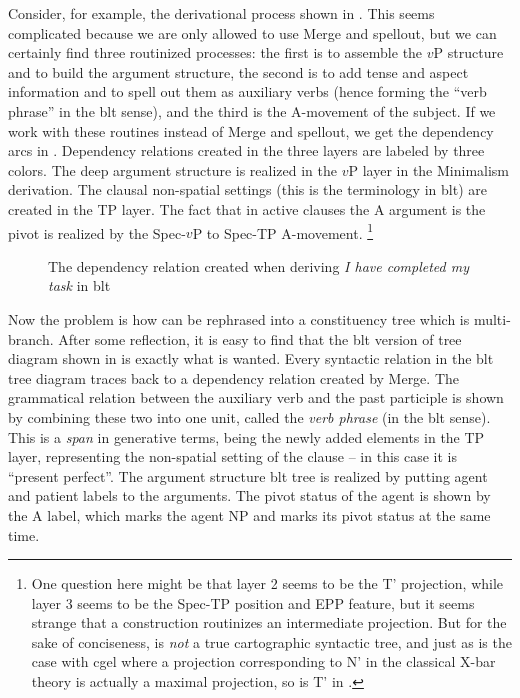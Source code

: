 \documentclass[../main.tex]{subfiles}
\begin{document}
Consider, for example, the derivational process shown in .
This seems complicated because we are only allowed to use Merge and spellout, 
but we can certainly find three routinized processes: 
the first is to assemble the $v$P structure and to build the argument structure, 
the second is to add tense and aspect information and to spell out them as auxiliary verbs
(hence forming the ``verb phrase'' in the \ac{blt} sense), 
and the third is the A-movement of the subject.
If we work with these routines instead of Merge and spellout, 
we get the dependency arcs in .
Dependency relations created in the three layers are labeled by three colors.
The deep argument structure is realized in the $v$P layer in the Minimalism derivation.
The clausal non-spatial settings (this is the terminology in \ac{blt}) are created in the TP layer.
The fact that in active clauses the A argument is the pivot is realized by the Spec-$v$P to Spec-TP A-movement.%
\footnote{One question here might be that layer 2 seems to be the T' projection, 
while layer 3 seems to be the Spec-TP position and EPP feature, 
but it seems strange that a construction routinizes an intermediate projection. 
But for the sake of conciseness, 
 is \emph{not} a true cartographic syntactic tree, 
and just as is the case with \ac{cgel} where 
a projection corresponding to N' in the classical X-bar theory is actually a maximal projection, 
so is T' in .}

\begin{figure}
    \centering 
    
    \caption{The dependency relation created when deriving \emph{I have completed my task} in \ac{blt}}
    \label{fig:complete-my-task-dep}
\end{figure}

Now the problem is how can  be rephrased into a constituency tree 
which is multi-branch. After some reflection, it is easy to find that 
the \ac{blt} version of tree diagram shown in  is exactly what is wanted.
Every syntactic relation in the \ac{blt} tree diagram 
traces back to a dependency relation created by Merge. 
The grammatical relation between the auxiliary verb and the past participle is shown 
by combining these two into one unit, called the \emph{verb phrase} (in the \ac{blt} sense).
This is a \emph{span} in generative terms, being the newly added elements in the TP layer,
representing the non-spatial setting of the clause -- in this case it is ``present perfect''.
The argument structure \ac{blt} tree is realized by putting agent and patient labels to the arguments.
The pivot status of the agent is shown by the A label, 
which marks the agent NP and marks its pivot status at the same time.
\end{document}
